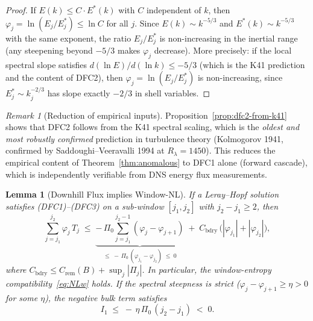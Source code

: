 \documentclass[12pt,a4paper]{article}
\theoremstyle{definition}
\theoremstyle{plain}
\newtheorem{lemma}[definition]{Lemma}
\theoremstyle{remark}
\newtheorem{remark}[definition]{Remark}
\begin{document}
\begin{proof}
If $E(k) \leq C \cdot E^*(k)$ with $C$ independent of $k$, then $\varphi_j = \ln(E_j/E_j^*) \leq \ln C$ for all $j$. Since $E(k) \sim k^{-5/3}$ and $E^*(k) \sim k^{-5/3}$ with the same exponent, the ratio $E_j/E_j^*$ is non-increasing in the inertial range (any steepening beyond $-5/3$ makes $\varphi_j$ decrease). More precisely: if the local spectral slope satisfies $d(\ln E)/d(\ln k) \leq -5/3$ (which is the K41 prediction and the content of DFC2), then $\varphi_j = \ln(E_j/E_j^*)$ is non-increasing, since $E_j^* \sim k_j^{-2/3}$ has slope exactly $-2/3$ in shell variables.
\end{proof}

\begin{remark}[Reduction of empirical inputs]\label{rem:empirical-reduction}
Proposition~\ref{prop:dfc2-from-k41} shows that DFC2 follows from the K41 spectral scaling, which is the \emph{oldest and most robustly confirmed} prediction in turbulence theory (Kolmogorov 1941, confirmed by Saddoughi--Veeravalli 1994 at $R_\lambda = 1450$). This reduces the empirical content of Theorem~\ref{thm:anomalous} to DFC1 alone (forward cascade), which is independently verifiable from DNS energy flux measurements.
\end{remark}

\begin{lemma}[Downhill Flux implies Window-NL]\label{lem:DFC-implies-NLw}
If a Leray--Hopf solution satisfies \textup{(DFC1)--(DFC3)} on a
sub-window $[j_1, j_2]$ with $j_2 - j_1 \ge 2$, then
\begin{equation}\label{eq:DFC-quantitative}
  \sum_{j=j_1}^{j_2} \varphi_j\,T_j
  \;\le\;
  \underbrace{-\,\Pi_0
    \sum_{j=j_1}^{j_2-1}(\varphi_j - \varphi_{j+1})}_{\le\;
    -\,\Pi_0\,(\varphi_{j_1}-\varphi_{j_2})\;\le\; 0}
  \;+\;
  C_{\mathrm{bdry}}\,
  \bigl(|\varphi_{j_1}| + |\varphi_{j_2}|\bigr),
\end{equation}
where $C_{\mathrm{bdry}} \le C_{\mathrm{rem}}(B) + \sup_{j}|\Pi_j|$. In particular,
the window-entropy compatibility~\eqref{eq:NLw} holds. If the
spectral steepness is strict ($\varphi_j - \varphi_{j+1} \ge \eta > 0$
for some $\eta$), the negative bulk term satisfies
\begin{equation}\label{eq:bulk-strict}
  I_1 \;\le\; -\,\eta\,\Pi_0\,(j_2 - j_1) \;<\; 0.
\end{equation}
\end{lemma}
\end{document}
